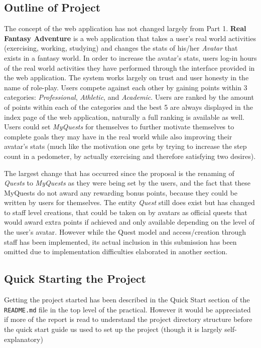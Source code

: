 \documentclass[11pt,a4paper]{article}
\begin{document}
\subsection{Outline of Project}
The concept of the web application has not changed largely from Part 1. \textbf{Real Fantasy Adventure} is a web application that takes a user's real world activities (exercising, working, studying) and changes the stats of his/her \textit{Avatar} that exists in a fantasy world. In order to increase the avatar's stats, users log-in hours
of the real world activities they have performed through the interface provided in the web application. The system works largely on trust and user honesty in the name of role-play. Users compete against each other by gaining points within 3 categories: \textit{Professional}, \textit{Athletic}, and \textit{Academic}. Users are ranked by the amount of points within each of the categories and the best 5 are always displayed in the index page of the web application, naturally a full ranking is available as well. Users could set \textit{MyQuests} for themselves to further motivate themselves to complete goals they may have in the real world while also improving their avatar's stats (much like the motivation one gets by trying to increase the step count in a pedometer, by actually exercising and therefore satisfying two desires).

The largest change that has occurred since the proposal is the renaming of \textit{Quests} to \textit{MyQuests} as they were being set by the users, and the fact that these MyQuests do not award any rewarding bonus points, because they could be written by users for themselves. The entity \textit{Quest} still does exist but has changed to staff level creations, that could be taken on by avatars as official quests that would award extra points if achieved and only available depending on the level of the user's avatar. However while the Quest model and access/creation through staff has been implemented, its actual inclusion in this submission has been omitted due to implementation difficulties elaborated in another section.

\subsection{Quick Starting the Project}
Getting the project started has been described in the Quick Start section of the \verb|README.md| file in the top level of the practical. However it would be appreciated if more of the report is read to understand the project directory structure before the quick start guide us used to set up the project (though it is largely self-explanatory)
\end{document}
